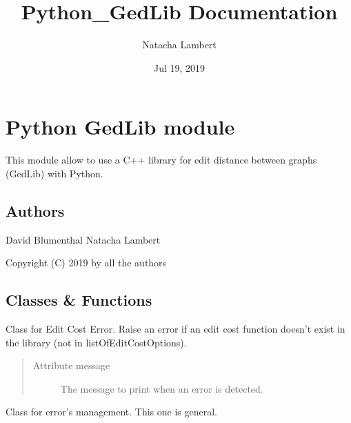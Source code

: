 \documentclass[letterpaper,10pt,english]{sphinxmanual}
\title{Python\_GedLib Documentation}
\date{Jul 19, 2019}
\author{Natacha Lambert}
\begin{document}
\maketitle
\tableofcontents
{}\label{index::doc}

\label{doc:module-PythonGedLib}

\chapter{Python GedLib module}
\label{doc:python-gedlib-module}\label{doc:welcome-to-python-gedlib-s-documentation}\label{doc::doc}
This module allow to use a C++ library for edit distance between graphs (GedLib) with Python.


\section{Authors}
\label{doc:authors}
David Blumenthal
Natacha Lambert

Copyright (C) 2019 by all the authors


\section{Classes \& Functions}
\label{doc:classes-functions}

\begin{fulllineitems}
\label{doc:PythonGedLib.EditCostError}
Class for Edit Cost Error. Raise an error if an edit cost function doesn't exist in the library (not in listOfEditCostOptions).
\begin{quote}\begin{description}
\item[{Attribute message}] \leavevmode
The message to print when an error is detected.

\end{description}\end{quote}

\end{fulllineitems}


\begin{fulllineitems}
\label{doc:PythonGedLib.Error}
Class for error's management. This one is general.

\end{fulllineitems}
\end{document}
